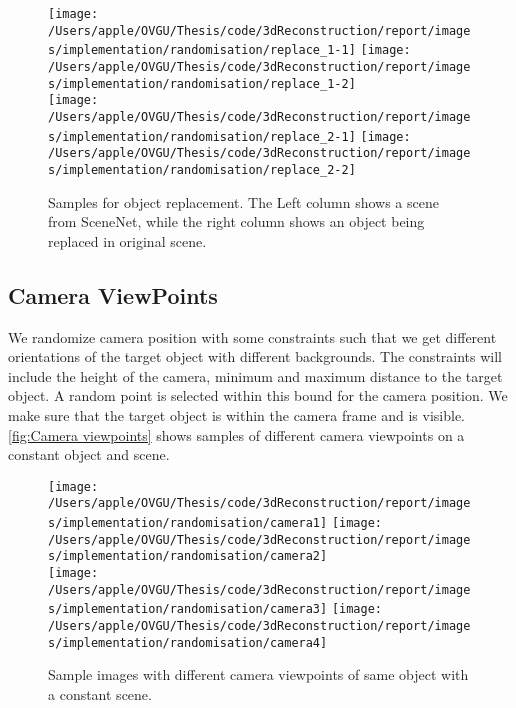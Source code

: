 \begin{figure}
    \centering
    \texttt{[image: /Users/apple/OVGU/Thesis/code/3dReconstruction/report/images/implementation/randomisation/replace\_1-1]}
    \texttt{[image: /Users/apple/OVGU/Thesis/code/3dReconstruction/report/images/implementation/randomisation/replace\_1-2]} \\
    \vspace{0.1cm}
    \texttt{[image: /Users/apple/OVGU/Thesis/code/3dReconstruction/report/images/implementation/randomisation/replace\_2-1]}
    \texttt{[image: /Users/apple/OVGU/Thesis/code/3dReconstruction/report/images/implementation/randomisation/replace\_2-2]}\\
    \caption[Samples for Object Replacement]{Samples for object replacement. The Left column shows a scene from SceneNet, while the right column shows an object being replaced in original scene.}
    \label{fig:replace model}
\end{figure}


\subsection{Camera ViewPoints}\label{subsec:camera-viewpoints}

We randomize camera position with some constraints such that we get different orientations of the target object with different backgrounds.
The constraints will include the height of the camera, minimum and maximum distance to the target object.
A random point is selected within this bound for the camera position.
We make sure that the target object is within the camera frame and is visible.
\autoref{fig:Camera viewpoints} shows samples of different camera viewpoints on a constant object and scene.

\begin{figure}
    \centering
    \texttt{[image: /Users/apple/OVGU/Thesis/code/3dReconstruction/report/images/implementation/randomisation/camera1]}
    \texttt{[image: /Users/apple/OVGU/Thesis/code/3dReconstruction/report/images/implementation/randomisation/camera2]}\\
    \vspace{0.1cm}
    \texttt{[image: /Users/apple/OVGU/Thesis/code/3dReconstruction/report/images/implementation/randomisation/camera3]}
    \texttt{[image: /Users/apple/OVGU/Thesis/code/3dReconstruction/report/images/implementation/randomisation/camera4]}\\
    \caption[Samples for Camera ViewPoints.]{Sample images with different camera viewpoints of same object with a constant scene.}
    \label{fig:Camera viewpoints}
\end{figure}

